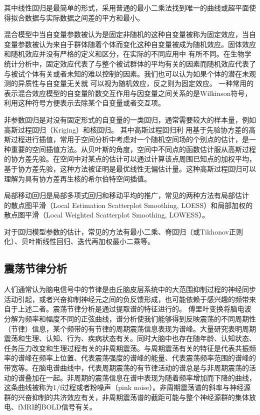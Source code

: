 其中线性回归是最简单的形式，采用普通的最小二乘法找到唯一的曲线或超平面使得拟合数据与实际数据之间差的平方和最小。

混合模型中当自变量参数被认为是固定非随机的这种自变量被称为固定效应，当自变量参数被认为来自于群体随着个体而变化这种自变量被成为随机效应。固体效应和随机效应并没有严格的定义和区分，在实际的不同应用中
有所不同。在生物学统计分析中，固定效应代表了与整个被试群体的平均有关的因素而随机效应代表了
与被试个体有关或者未知的难以控制的因素。我们也可以认为如果个体的潜在未观测的异质性与自变量无关就
可以视为随机效应，反之则为固定效应。 一种常用的表示混合效应模型的自变量阶数交互作用与因变量之间关系的是Wilkinson符号，利用这种符号方便表示去除某个自变量或者交互项。

非参数回归是对没有固定形式的自变量的一类回归，通常需要较大的样本量，例如高斯过程回归（Kriging）和核回归。 其中高斯过程回归利
用基于先验协方差的高斯过程进行插值，常用于空间分析中考虑对一个随机空间场的个别点的估计，是一种重要的空间插值方法。从贝叶斯的角度，空间中不同点的函数估计服从高斯过程的协方差先验。在空间中对某点的估计可以通过计算该点周围已知点的加权平均，基于协方差先验，这种方法被证明是最优线性无偏估计量。这种高斯过程回归可以理解为具有协方差再生核的希尔伯特空间插值。 

局部移动回归是局部多项式回归和移动平均的推广，常见的两种方法有局部估计
的散点图平滑（Local Estimation Scatterplot Smoothing, LOESS）和局部加权的散点图平滑（Local Weighted Scatterplot Smoothing, LOWESS）。

对于回归模型参数的估计，常见的方法有最小二乘、脊回归（或Tikhonov正则化）、贝叶斯线性回归、迭代再加权最小二乘等。

\subsection{震荡节律分析}
人们通常认为脑电信号中的节律是由丘脑皮层系统中的大范围抑制过程的神经同步活动引起，或者兴奋抑制神经元之间的负反馈形成，也可能依赖于感兴趣的频带来自于上述二者。震荡节律分析是通过提取谱的特征进行的。 傅里叶变换将脑电波分解为频率和幅度不同的正弦曲线，谱分析使我们能够得到反映震荡的不同周期性（节律）信息，某个频带的有节律的周期震荡信息表现为谱峰。大量研究表明周期震荡和生理、认知、行为、疾病状态有关。同时大脑中也存在随年龄、认知状态、任务压力改变和生理过程有关的非周期震荡。与周期震荡有关的特征是代表共振频率的谱峰在频率上位置、代表震荡强度的谱峰的能量、代表震荡频率范围的谱峰的带宽等。在脑电谱曲线中，代表周期震荡的有节律活动的谱总是与非周期震荡的活动的谱叠加在一起。非周期的震荡信息在谱中表现为随着频率增加而下降的曲线，这条曲线被称为1/f过程或者粉噪声（pink noise）。非周期震荡谱的斜率与神经源群的兴奋抑制的共济效应有关，非周期震荡谱的截距可能与整个神经源群的集体放电、fMRI的BOLD信号有关。

